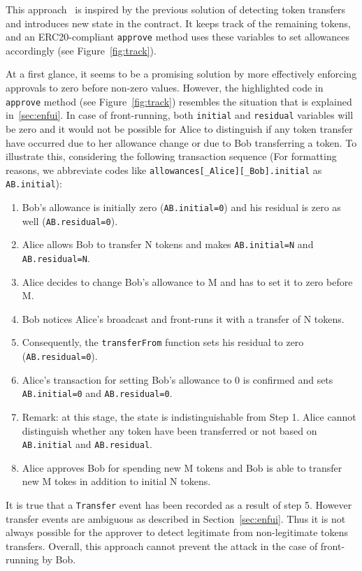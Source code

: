 This approach~\cite{Ref18} is inspired by the previous solution of detecting token transfers and introduces new state in the contract. It keeps track of the remaining tokens, and an ERC20-compliant \texttt{approve} method uses these variables to set allowances accordingly (see Figure~\ref{fig:track}).

At a first glance, it seems to be a promising solution by more effectively enforcing approvals to zero before non-zero values. However, the highlighted code in \texttt{approve} method (see Figure~\ref{fig:track}) resembles the situation that is explained in~\ref{sec:enfui}. In case of front-running, both \texttt{initial} and \texttt{residual} variables will be zero and it would not be possible for Alice to distinguish if any token transfer have occurred due to her allowance change or due to Bob transferring a token. To illustrate this, considering the following transaction sequence (For formatting reasons, we abbreviate codes like \texttt{allowances[\_Alice][\_Bob].initial} as \texttt{AB.initial}):

\begin{enumerate}
	\item Bob’s allowance is initially zero (\texttt{AB.initial=0}) and his residual is zero as well (\texttt{AB.residual=0}).
	\item Alice allows Bob to transfer N tokens and makes \texttt{AB.initial=N} and \texttt{AB.residual=N}.
	\item Alice decides to change Bob’s allowance to M and has to set it to zero before M.
	\item Bob notices Alice’s broadcast and front-runs it with a transfer of N tokens.
	\item Consequently, the \texttt{transferFrom} function sets his residual to zero (\texttt{AB.residual=0}).
	\item Alice’s transaction for setting Bob's allowance to 0 is confirmed and sets \texttt{AB.initial=0} and \texttt{AB.residual=0}.
	\item Remark: at this stage, the state is indistinguishable from Step 1. Alice cannot distinguish whether any token have been transferred or not based on \texttt{AB.initial} and \texttt{AB.residual}. 
	\item Alice approves Bob for spending new M tokens and Bob is able to transfer new M tokes in addition to initial N tokens.
\end{enumerate}

It is true that a \texttt{Transfer} event has been recorded as a result of step 5. However transfer events are ambiguous as described in Section~\ref{sec:enfui}. Thus it is not always possible for the approver to detect legitimate from non-legitimate tokens transfers. Overall, this approach cannot prevent the attack in the case of front-running by Bob. 

